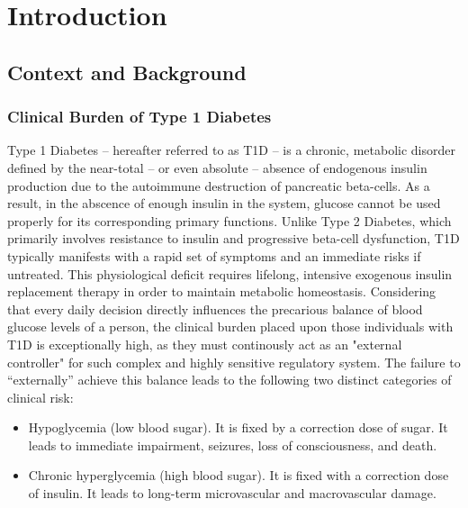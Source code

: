 \chapter{Introduction}
\label{chap:introduction}

\section{Context and Background}
\label{sec:context_and_background}

\subsection{Clinical Burden of Type 1 Diabetes}
\label{subsec:clinical_burden_t1d}

Type 1 Diabetes -- hereafter referred to as T1D -- is a chronic, metabolic disorder defined by the near-total -- or even absolute -- absence of endogenous insulin production due to the autoimmune destruction of pancreatic beta-cells. As a result, in the abscence of enough insulin in the system, glucose cannot be used properly for its corresponding primary functions.
Unlike Type 2 Diabetes, which primarily involves resistance to insulin and progressive beta-cell dysfunction, T1D typically manifests with a rapid set of symptoms and an immediate risks if untreated.
This physiological deficit requires lifelong, intensive exogenous insulin replacement therapy in order to maintain metabolic homeostasis. Considering that every daily decision directly influences the precarious balance of blood glucose levels of a person, the clinical burden placed upon those individuals with T1D is exceptionally high, as they must continously act as an "external controller" for such complex and highly sensitive regulatory system. The failure to “externally” achieve this balance leads to the following two distinct categories of clinical risk:
\begin{itemize}
    \item Hypoglycemia (low blood sugar). It is fixed by a correction dose of sugar. It leads to immediate impairment, seizures, loss of consciousness, and death.
    \item Chronic hyperglycemia (high blood sugar). It is fixed with a correction dose of insulin. It leads to long-term microvascular and macrovascular damage.
\end{itemize}

